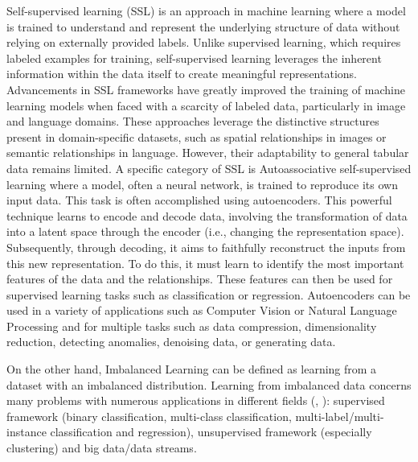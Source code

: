 \documentclass{article}
\theoremstyle{definition}
\begin{document}
Self-supervised learning (SSL) is an approach in machine learning where a model is trained to understand and represent the underlying structure of data without relying on externally provided labels. Unlike supervised learning, which requires labeled examples for training, self-supervised learning leverages the inherent information within the data itself to create meaningful representations. 
Advancements in SSL frameworks have greatly improved the training of machine learning models when faced with a scarcity of labeled data, particularly in image and language domains. These approaches leverage the distinctive structures present in domain-specific datasets, such as spatial relationships in images or semantic relationships in language. However, their adaptability to general tabular data remains limited. A specific category of SSL is Autoassociative self-supervised learning where a model, often a neural network, is trained to reproduce its own input data. This task is often accomplished using autoencoders. This powerful technique learns to encode and decode data, involving the transformation of data into a latent space through the encoder (i.e., changing the representation space). Subsequently, through decoding, it aims to faithfully reconstruct the inputs from this new representation. To do this, it must learn to identify the most important features of the data and the relationships. These features can then be used for supervised learning tasks such as classification or regression. Autoencoders can be used in a variety of applications such as Computer Vision or Natural Language Processing and for multiple tasks such as data compression, dimensionality reduction, detecting anomalies, denoising data, or generating data.

On the other hand, Imbalanced Learning can be defined as learning from a dataset with an imbalanced distribution. Learning from imbalanced data concerns many problems with numerous applications in different fields (\citep{krawczyk2016learning}, \citep{fernandez2018learning}): supervised framework (binary classification, multi-class classification, multi-label/multi-instance classification and regression), unsupervised framework (especially clustering) and big data/data streams. 
\end{document}
